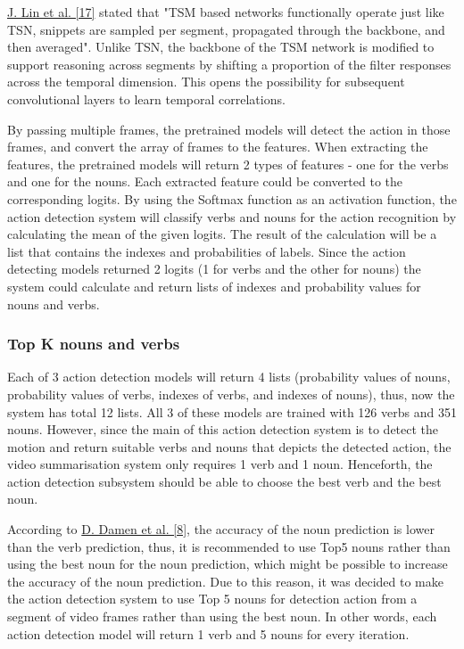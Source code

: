 \documentclass{article}
\begin{document}
\hyperlink{ref17}{J. Lin et al. [17]} stated that "TSM based networks functionally operate just like TSN, snippets are sampled per segment, propagated through the backbone, and then averaged". Unlike TSN, the backbone of the TSM network is modified to support reasoning across segments by shifting a proportion of the filter responses across the temporal dimension. This opens the possibility for subsequent convolutional layers to learn temporal correlations.

By passing multiple frames, the pretrained models will detect the action in those frames, and convert the array of frames to the features. When extracting the features, the pretrained models will return 2 types of features - one for the verbs and one for the nouns. Each extracted feature could be converted to the corresponding logits. By using the Softmax function as an activation function, the action detection system will classify verbs and nouns for the action recognition by calculating the mean of the given logits. The result of the calculation will be a list that contains the indexes and probabilities of labels. Since the action detecting models returned 2 logits (1 for verbs and the other for nouns) the system could calculate and return lists of indexes and probability values for nouns and verbs.

\subsubsection{Top K nouns and verbs}

Each of 3 action detection models will return 4 lists (probability values of nouns, probability values of verbs, indexes of verbs, and indexes of nouns), thus, now the system has total 12 lists. All 3 of these models are trained with 126 verbs and 351 nouns. However, since the main of this action detection system is to detect the motion and return suitable verbs and nouns that depicts the detected action, the video summarisation system only requires 1 verb and 1 noun. Henceforth, the action detection subsystem should be able to choose the best verb and the best noun.

According to \hyperlink{ref8}{D. Damen et al. [8]}, the accuracy of the noun prediction is lower than the verb prediction, thus, it is recommended to use Top5 nouns rather than using the best noun for the noun prediction, which might be possible to increase the accuracy of the noun prediction. Due to this reason, it was decided to make the action detection system to use Top 5 nouns for detection action from a segment of video frames rather than using the best noun. In other words, each action detection model will return 1 verb and 5 nouns for every iteration.
\end{document}
